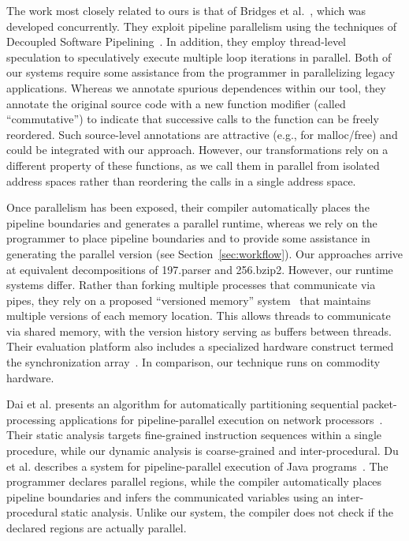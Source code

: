 The work most closely related to ours is that of Bridges et
al.~\cite{bridges07revisiting}, which was developed concurrently.
They exploit pipeline parallelism using the techniques of Decoupled
Software Pipelining~\cite{ottoni05decoupled,rangan04array}.  In
addition, they employ thread-level speculation to speculatively
execute multiple loop iterations in parallel.  Both of our systems
require some assistance from the programmer in parallelizing legacy
applications.  Whereas we annotate spurious dependences within our
tool, they annotate the original source code with a new function
modifier (called ``commutative'') to indicate that successive calls to
the function can be freely reordered.  Such source-level annotations
are attractive (e.g., for malloc/free) and could be integrated with
our approach.  However, our transformations rely on a different
property of these functions, as we call them in parallel from isolated
address spaces rather than reordering the calls in a single address
space.

Once parallelism has been exposed, their compiler automatically places
the pipeline boundaries and generates a parallel runtime, whereas we
rely on the programmer to place pipeline boundaries and to provide
some assistance in generating the parallel version (see
Section~\ref{sec:workflow}).  Our approaches arrive at equivalent
decompositions of 197.parser and 256.bzip2.  However, our runtime
systems differ.  Rather than forking multiple processes that
communicate via pipes, they rely on a proposed ``versioned memory''
system~\cite{vachharajani07speculation} that maintains multiple
versions of each memory location.  This allows threads to communicate
via shared memory, with the version history serving as buffers between
threads.  Their evaluation platform also includes a specialized
hardware construct termed the synchronization
array~\cite{rangan04array}.  In comparison, our technique runs on
commodity hardware.

Dai et al. presents an algorithm for automatically partitioning
sequential packet-processing applications for pipeline-parallel
execution on network processors~\cite{dai05packet}.  
Their static analysis targets fine-grained instruction sequences
within a single procedure, while our dynamic analysis is
coarse-grained and inter-procedural.  Du et al. describes a system for
pipeline-parallel execution of Java programs~\cite{du03sc}.  The
programmer declares parallel regions, while the compiler automatically
places pipeline boundaries and infers the communicated variables using
an inter-procedural static analysis.  Unlike our system, the compiler
does not check if the declared regions are actually parallel.

